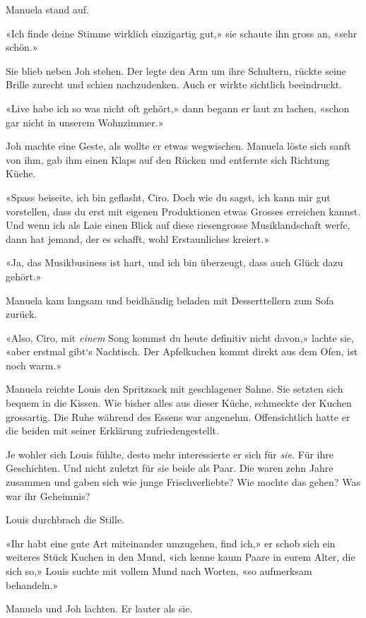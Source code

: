 Manuela stand auf.

«Ich finde deine Stimme wirklich einzigartig gut,» sie schaute ihn gross
an, «sehr schön.»

Sie blieb neben Joh stehen. Der legte den Arm um ihre Schultern, rückte
seine Brille zurecht und schien nachzudenken. Auch er wirkte sichtlich
beeindruckt.

«Live habe ich so was nicht oft gehört,» dann begann er laut zu lachen,
«schon gar nicht in unserem Wohnzimmer.»

Joh machte eine Geste, als wollte er etwas wegwischen. Manuela löste
sich sanft von ihm, gab ihm einen Klaps auf den Rücken und entfernte
sich Richtung Küche.

«Spass beiseite, ich bin geflasht, Ciro. Doch wie du sagst, ich kann mir
gut vorstellen, dass du erst mit eigenen Produktionen etwas Grosses
erreichen kannst. Und wenn ich als Laie einen Blick auf diese
riesengrosse Musiklandschaft werfe, dann hat jemand, der es schafft,
wohl Erstaunliches kreiert.»

«Ja, das Musikbusiness ist hart, und ich bin überzeugt, dass auch Glück
dazu gehört.»

Manuela kam langsam und beidhändig beladen mit Desserttellern zum Sofa
zurück.

«Also, Ciro, mit \emph{einem} Song kommst du heute definitiv nicht
davon,» lachte sie, «aber erstmal gibt`s Nachtisch. Der Apfelkuchen
kommt direkt aus dem Ofen, ist noch warm.»

Manuela reichte Louis den Spritzsack mit geschlagener Sahne. Sie setzten
sich bequem in die Kissen. Wie bisher alles aus dieser Küche, schmeckte
der Kuchen grossartig. Die Ruhe während des Essens war angenehm.
Offensichtlich hatte er die beiden mit seiner Erklärung
zufriedengestellt.

Je wohler sich Louis fühlte, desto mehr interessierte er sich für
\emph{sie.} Für ihre Geschichten. Und nicht zuletzt für sie beide als
Paar. Die waren zehn Jahre zusammen und gaben sich wie junge
Frischverliebte? Wie mochte das gehen? Was war ihr Geheimnis?

Louis durchbrach die Stille.

«Ihr habt eine gute Art miteinander umzugehen, find ich,» er schob sich
ein weiteres Stück Kuchen in den Mund, «ich kenne kaum Paare in eurem
Alter, die sich so,» Louis suchte mit vollem Mund nach Worten, «so
aufmerksam behandeln.»

Manuela und Joh lachten. Er lauter als sie.

